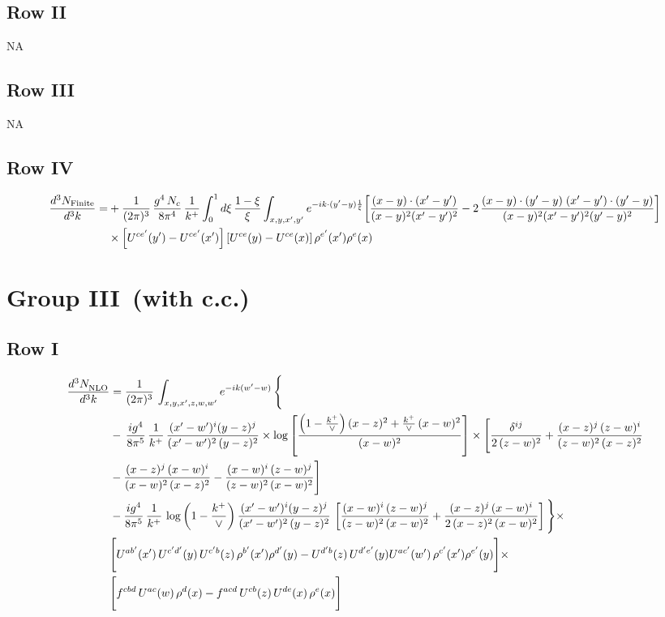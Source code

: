 \documentclass[9pt]{article}
\numberwithin{equation}{section}
\begin{document}
\subsection{Row II}
\textsc{NA}
\subsection{Row III}
\textsc{NA}
\subsection{Row IV}
\begin{align}
\frac{d^{3}N_{\rm Finite}}{d^{3}k}= &  +\frac{1}{(2\pi)^{3}}\,\frac{g^{4}\,N_{c}}{8\pi^{4}}\,\frac{1}{k^{+}}\int_{0}^{1}d\xi\,\frac{1-\xi}{\xi}\int_{x,y,x',y'}e^{-ik\cdot(y'-y)\frac{1}{\xi}}\bigg[\frac{(x-y)\cdot(x'-y')}{(x-y)^{2}(x'-y')^{2}}-2\,\frac{(x-y)\cdot(y'-y)\;(x'-y')\cdot(y'-y)}{(x-y)^{2}(x'-y')^{2}(y'-y)^{2}}\bigg]\notag\\
&\times\left[U^{ce'}(y') - U^{ce'}(x')\right]\left[U^{ce}(y) - U^{ce}(x)\right]\rho^{e'}(x')\rho^{e}(x)
\end{align}
\section{Group III\, (with c.c.)}
\subsection{Row I}
\begin{align}
     \frac{d^{3}N_{\rm NLO}^{\rm}}{d^{3}k}  & =   \frac{1}{(2\pi)^{3}}\, \int_{x,y,x',z,w,w^{\prime}} e^{-ik(w^{\prime}-w)}\, \Bigg\{\notag \\
& -\,\frac{ig^{4}}{8\pi^{5}}\,\frac{1}{k^{+}}\,\frac{(x'-w')^{i}(y-z)^{j}}{(x'-w')^{2}\,(y-z)^{2}}\times \log{\left[\frac{\left(1-\frac{k^{+}}{\vee}\right)(x-z)^{2}+\frac{k^{+}}{\vee}\,(x-w)^{2}}{(x-w)^{2}}\right]}\times \Bigg[\frac{\delta^{ij}}{2\,(z-w)^{2}}+\frac{(x-z)^{j}\,(z-w)^{i}}{(z-w)^{2}\,(x-z)^{2}}\notag \\ & -\frac{(x-z)^{j}\,(x-w)^{i}}{(x-w)^{2}\,(x-z)^{2}}-\frac{(x-w)^{i}\,(z-w)^{j}}{(z-w)^{2}\,(x-w)^{2}}\Bigg] \notag \\
& -\frac{ig^{4}}{8\pi^{5}}\,\frac{1}{k^{+}}\,\log{\left(1-\frac{k^{+}}{\vee}\right)}\,\frac{(x'-w')^{i}(y-z)^{j}}{(x'-w')^{2}\,(y-z)^{2}}\,\left[\frac{(x-w)^{i}\,(z-w)^{j}}{(z-w)^{2}\,(x-w)^{2}}+\frac{(x-z)^{j}\,(x-w)^{i}}{2\,(x-z)^{2}\, (x-w)^{2}}\right]\Bigg\}\times \notag \\ &  \Bigg[U^{ab'}(x')\,U^{c'd'}(y)\,U^{c'b}(z)\,\rho^{b'}(x')\rho^{d'}(y)-U^{d'b}(z)\,U^{d'e'}(y)U^{ac'}(w')\,\rho^{c'}(x')\rho^{e'}(y)\Bigg]\times\notag \\ & \Bigg[f^{cbd}\,U^{ac}(w)\,\rho^{d}(x)-f^{acd}\, U^{cb}(z)\,U^{de}(x)\,\rho^{e}(x)\Bigg]
\end{align}
\end{document}
